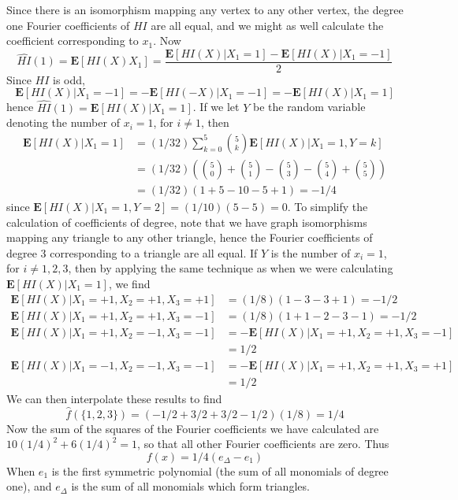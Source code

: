 \begin{example}
    Since there is an isomorphism mapping any vertex to any other vertex, the degree one Fourier coefficients of $HI$ are all equal, and we might as well calculate the coefficient corresponding to $x_1$. Now
    \[ \widehat{HI}(1) = \mathbf{E}[HI(X)X_1] = \frac{\mathbf{E}[HI(X) | X_1 = 1] - \mathbf{E}[HI(X) | X_1 = -1]}{2} \]
    Since $HI$ is odd,
    \[ \mathbf{E}[HI(X) | X_1 = -1] = -\mathbf{E}[HI(-X) | X_1 = -1] = -\mathbf{E}[HI(X) | X_1 = 1] \]
    hence $\widehat{HI}(1) = \mathbf{E}[HI(X) | X_1 = 1]$. If we let $Y$ be the random variable denoting the number of $x_i = 1$, for $i \neq 1$, then
    \begin{align*}
        \mathbf{E}[HI(X) | X_1 = 1] &= (1/32) \sum_{k = 0}^5 {5 \choose k} \mathbf{E}[HI(X)|X_1 = 1, Y = k]\\
        &= (1/32) \left( {5 \choose 0} + {5 \choose 1} - {5 \choose 3} - {5 \choose 4} + {5 \choose 5} \right)\\
        &= (1/32)(1 + 5 - 10 - 5 + 1) = -1/4
    \end{align*}
    since $\mathbf{E}[HI(X) | X_1 = 1, Y = 2] = (1/10)(5 - 5) = 0$. To simplify the calculation of coefficients of degree, note that we have graph isomorphisms mapping any triangle to any other triangle, hence the Fourier coefficients of degree 3 corresponding to a triangle are all equal. If $Y$ is the number of $x_i = 1$, for $i \neq 1,2,3$, then by applying the same technique as when we were calculating $\mathbf{E}[HI(X) | X_1 = 1]$, we find
    \begin{align*}
        \mathbf{E}[HI(X) | X_1 = +1, X_2 = +1, X_3 = +1] &= (1/8)(1 - 3 - 3 + 1) = -1/2\\
        \mathbf{E}[HI(X) | X_1 = +1, X_2 = +1, X_3 = -1] &= (1/8)(1 + 1 - 2 - 3 - 1) = -1/2\\
        \mathbf{E}[HI(X) | X_1 = +1, X_2 = -1, X_3 = -1] &=  -\mathbf{E}[HI(X) | X_1 = +1, X_2 = +1, X_3 = -1]\\
        &= 1/2\\
        \mathbf{E}[HI(X) | X_1 = -1, X_2 = -1, X_3 = -1] &= - \mathbf{E}[HI(X) | X_1 = +1, X_2 = +1, X_3 = +1]\\
        &= 1/2
    \end{align*}
    We can then interpolate these results to find
    \[ \widehat{f}(\{ 1, 2, 3 \}) = (-1/2 + 3/2 + 3/2 - 1/2)(1/8) = 1/4 \]
    Now the sum of the squares of the Fourier coefficients we have calculated are $10(1/4)^2 + 6(1/4)^2 = 1$, so that all other Fourier coefficients are zero. Thus
    \[ f(x) = 1/4(e_\Delta - e_1) \]
    When $e_1$ is the first symmetric polynomial (the sum of all monomials of degree one), and $e_\Delta$ is the sum of all monomials which form triangles.
\end{example}

